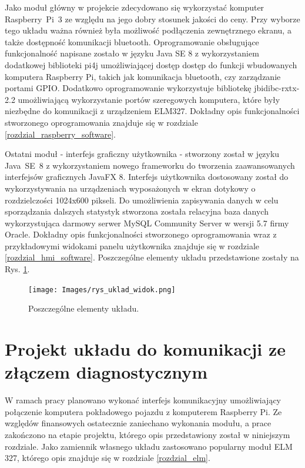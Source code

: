 \documentclass[12pt]{article} %
\numberwithin{equation}{subsection}
\numberwithin{figure}{section}
\numberwithin{table}{section}
\begin{document}
	\newpage
	
	Jako moduł główny w projekcie zdecydowano się wykorzystać komputer \mbox{Raspberry Pi 3} ze względu na jego dobry stosunek jakości do ceny. Przy wyborze tego układu ważna również była możliwość podłączenia zewnętrznego ekranu, a także dostępność komunikacji bluetooth. Oprogramowanie obsługujące funkcjonalność napisane zostało w języku Java SE 8 z wykorzystaniem dodatkowej biblioteki pi4j umożliwiającej dostęp dostęp do funkcji wbudowanych komputera Raspberry Pi, takich jak komunikacja bluetooth, czy zarządzanie portami GPIO. Dodatkowo oprogramowanie wykorzystuje bibliotekę jbidibc-rxtx-2.2 umożliwiającą wykorzystanie portów szeregowych komputera, które były niezbędne do komunikacji z urządzeniem ELM327. Dokładny opis funkcjonalności stworzonego oprogramowania znajduje się w rozdziale \ref{rozdzial_raspberry_software}.
	
	Ostatni moduł - interfejs graficzny użytkownika - stworzony został w języku \mbox{Java SE 8} z wykorzystaniem nowego frameworku do tworzenia zaawansowanych interfejsów graficznych JavaFX 8. Interfejs użytkownika dostosowany został do wykorzystywania na urządzeniach wyposażonych w ekran dotykowy o rozdzielczości 1024x600 pikseli. Do umożliwienia zapisywania danych w celu sporządzania dalszych statystyk stworzona została relacyjna baza danych wykorzystująca darmowy serwer MySQL Community Server w wersji 5.7 firmy Oracle. Dokładny opis funkcjonalności stworzonego oprogramowania wraz z przykładowymi widokami panelu użytkownika znajduje się w rozdziale \ref{rozdzial_hmi_software}. Poszczególne elementy układu przedstawione zostały na Rys. \ref{rys_uklad_widok}.
	
	\begin{figure}[!h]
		\centering
		\texttt{[image: Images/rys\_uklad\_widok.png]}
		\caption{Poszczególne elementy układu.}
		\label{rys_uklad_widok}
		\end{figure}
	
	\newpage	
	
\section{Projekt układu do komunikacji ze złączem diagnostycznym} \label{rozdzial_uklad_stm}
	
	\hspace{0.5cm}W ramach pracy planowano wykonać interfejs komunikacyjny umożliwiający połączenie komputera pokładowego pojazdu z komputerem Raspberry Pi. Ze względów finansowych ostatecznie zaniechano wykonania modułu, a prace zakończono na etapie projektu, którego opis przedstawiony został w niniejszym rozdziale. Jako zamiennik własnego układu zastosowano popularny moduł ELM 327, którego opis znajduje się w rozdziale \ref{rozdzial_elm}.
	
\end{document}
